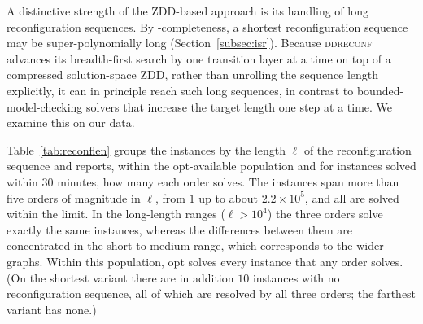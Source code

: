 \documentclass[conference]{IEEEtran}
\newcommand{\OptDecom}{\textsf{opt}\xspace}
\begin{document}
A distinctive strength of the ZDD-based approach is its handling of long
reconfiguration sequences.
By \PSPACE-completeness, a shortest reconfiguration sequence may be
super-polynomially long (Section~\ref{subsec:isr}).
Because \textsc{ddreconf} advances its breadth-first search by one transition
layer at a time on top of a compressed solution-space ZDD, rather than unrolling
the sequence length explicitly, it can in principle reach such long sequences,
in contrast to bounded-model-checking solvers that increase the target length
one step at a time.
We examine this on our data.
 
Table~\ref{tab:reconflen} groups the instances by the length $\ell$ of the
reconfiguration sequence and reports, within the opt-available population and for
instances solved within $30$ minutes, how many each order solves.
The instances span more than five orders of magnitude in $\ell$, from $1$ up to
about $2.2\times10^{5}$, and all are solved within the limit.
In the long-length ranges ($\ell>10^{4}$) the three orders solve exactly the
same instances, whereas the differences between them are concentrated in the
short-to-medium range, which corresponds to the wider graphs.
Within this population, \OptDecom solves every instance that any order solves.
(On the shortest variant there are in addition $10$ instances with no
reconfiguration sequence, all of which are resolved by all three orders; the
farthest variant has none.)
 
\end{document}
